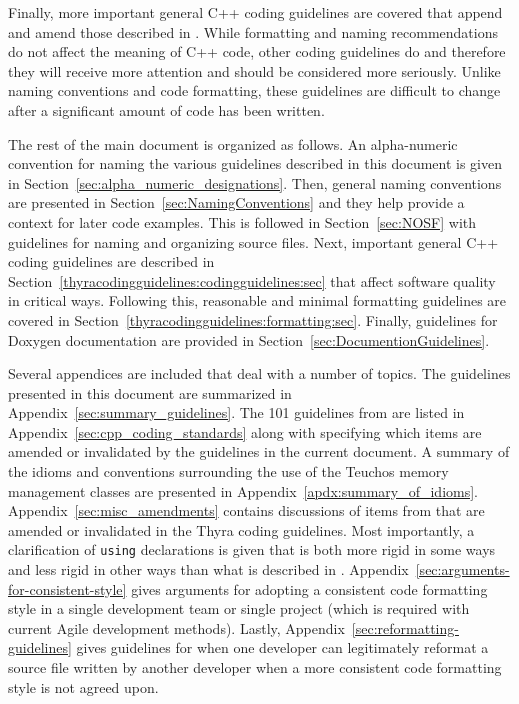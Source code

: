 Finally, more important general C++ coding guidelines are covered that
append and amend those described in {}\cite{C++CodingStandards05}.
While formatting and naming recommendations do not affect the meaning
of C++ code, other coding guidelines do and therefore they will
receive more attention and should be considered more seriously.
Unlike naming conventions and code formatting, these guidelines are
difficult to change after a significant amount of code has been
written.

The rest of the main document is organized as follows.  An
alpha-numeric convention for naming the various guidelines described
in this document is given in
Section~\ref{sec:alpha_numeric_designations}.  Then, general naming
conventions are presented in Section~\ref{sec:NamingConventions} and
they help provide a context for later code examples.  This is followed
in Section~\ref{sec:NOSF} with guidelines for naming and organizing
source files.  Next, important general C++ coding guidelines are
described in Section~\ref{thyracodingguidelines:codingguidelines:sec}
that affect software quality in critical ways.  Following this,
reasonable and minimal formatting guidelines are covered in
Section~\ref{thyracodingguidelines:formatting:sec}.  Finally,
guidelines for Doxygen documentation are provided in
Section~\ref{sec:DocumentionGuidelines}.

Several appendices are included that deal with a number of topics.
The guidelines presented in this document are summarized in
Appendix~\ref{sec:summary_guidelines}.  The 101 guidelines from
{}\cite{C++CodingStandards05} are listed in
Appendix~\ref{sec:cpp_coding_standards} along with specifying which
items are amended or invalidated by the guidelines in the current
document.  A summary of the idioms and conventions surrounding the use
of the Teuchos memory management classes are presented in
Appendix~\ref{apdx:summary_of_idioms}.
Appendix~\ref{sec:misc_amendments} contains discussions of items from
{}\cite{C++CodingStandards05} that are amended or invalidated in the
Thyra coding guidelines.  Most importantly, a clarification of
{}\texttt{using} declarations is given that is both more rigid in some
ways and less rigid in other ways than what is described in
{}\cite[Item 59]{C++CodingStandards05}.
Appendix~\ref{sec:arguments-for-consistent-style} gives arguments for
adopting a consistent code formatting style in a single development
team or single project (which is required with current Agile
development methods).  Lastly,
Appendix~\ref{sec:reformatting-guidelines} gives guidelines for when
one developer can legitimately reformat a source file written by
another developer when a more consistent code formatting style is not
agreed upon.


